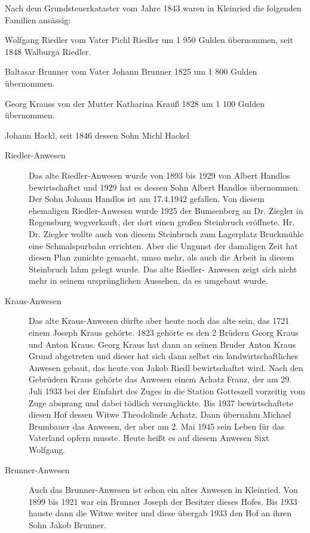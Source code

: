 \documentclass{book}
\begin{document}
Nach dem Grundsteuerkataster vom Jahre 1843 waren in Kleinried die
folgenden Familien ansässig:

\begin{compactitem}
\item Wolfgang Riedler vom Vater Pichl Riedler um 1 950 Gulden
übernommen, seit 1848 Walburga Riedler.
\item Baltasar Brunner vom Vater Johann Brunner 1825 um 1 800 Gulden
übernommen.
\item Georg Krauss von der Mutter Katharina Krauß 1828 um 1 100 Gulden
übernommen.
\item Johann Hackl, seit 1846 dessen Sohn Michl Hackel
\end{compactitem}

\begin{description}
\item[Riedler-Anwesen] Das alte Riedler-Anwesen wurde von 1893 bis 1929
von Albert Handlos bewirtschaftet und 1929 hat es dessen Sohn Albert
Handlos übernommen. Der Sohn Johann Handlos ist am 17.4.1942 gefallen.
Von diesem ehemaligen Riedler-Anwesen wurde 1925 der Bumsenberg an Dr.
Ziegler in Regensburg wegverkauft, der dort einen großen Steinbruch
eröffnete. Hr. Dr. Ziegler wollte auch von diesem Steinbruch zum
Lagerplatz Bruckmühle eine Schmalspurbahn errichten. Aber die Ungunst
der damaligen Zeit hat diesen Plan zunichte gemacht, umso mehr, als auch
die Arbeit in diesem Steinbruch lahm gelegt wurde. Das alte Riedler-
Anwesen zeigt sich nicht mehr in seinem ursprünglichen Aussehen, da es
umgebaut wurde.

\item[Kraus-Anwesen] Das alte Kraus-Anwesen dürfte aber heute noch das
alte sein, das 1721 einem Joseph Kraus gehörte. 1823 gehörte es den 2
Brüdern Georg Kraus und Anton Kraus. Georg Kraus hat dann an seinen
Bruder Anton Kraus Grund abgetreten und dieser hat sich dann selbst ein
landwirtschaftliches Anwesen gebaut, das heute von Jakob Riedl
bewirtschaftet wird. Nach den Gebrüdern Kraus gehörte das Anwesen einem
Achatz Franz, der am 29. Juli 1933 bei der Einfahrt des Zuges in die
Station Gotteszell vorzeitig vom Zuge absprang und dabei tödlich
verunglückte. Bis 1937 bewirtschaftete diesen Hof dessen Witwe
Theodolinde Achatz. Dann übernahm Michael Brumbauer das Anwesen, der
aber am 2. Mai 1945 sein Leben für das Vaterland opfern musste. Heute
heißt es auf diesem Anwesen Sixt Wolfgang.

\item[Brunner-Anwesen] Auch das Brunner-Anwesen ist schon ein altes
Anwesen in Kleinried. Von 1899 bis 1921 war ein Brunner Joseph der
Besitzer dieses Hofes. Bis 1933 hauste dann die Witwe weiter und diese
übergab 1933 den Hof an ihren Sohn Jakob Brunner.


\end{description}
\end{document}
